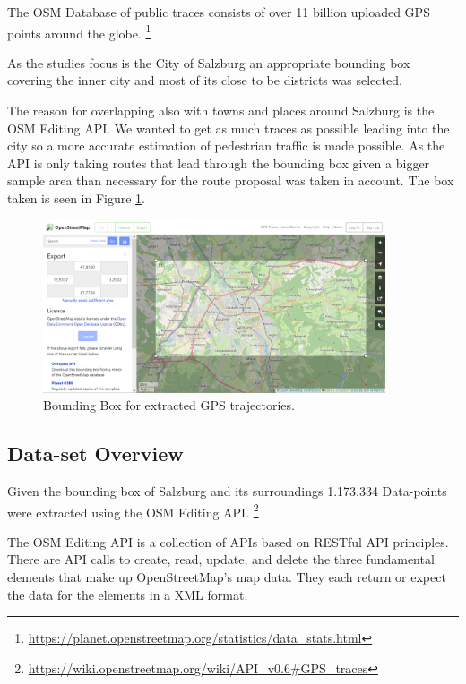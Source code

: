 The OSM Database of public traces consists of over 11 billion uploaded GPS points around the globe. \footnote{\url{https://planet.openstreetmap.org/statistics/data_stats.html}}

As the studies focus is the City of Salzburg an appropriate bounding box covering the inner city and most of its close to be districts was selected. 

The reason for overlapping also with towns and places around Salzburg is the OSM Editing API. We wanted to get as much traces as possible leading into the city so a more accurate estimation of pedestrian traffic is made possible. As the API is only taking routes that lead through the bounding box given a bigger sample area than necessary for the route proposal was taken in account. The box taken is seen in Figure \ref{figure:BoundingBox}.

\begin{figure}[t]
 	\centering
 	\includegraphics[width=0.9\textwidth]{images/BoundingBoxOSM.png}
 	\caption{
 		Bounding Box for extracted GPS trajectories.
 	}
 	\label{figure:BoundingBox}
\end{figure}

\subsection{Data-set Overview}

Given the bounding box of Salzburg and its surroundings 1.173.334 Data-points were extracted using the OSM Editing API. \footnote{\url{https://wiki.openstreetmap.org/wiki/API_v0.6#GPS_traces}}

The OSM Editing API is a collection of APIs based on RESTful API principles. There are API calls to create, read, update, and delete the three fundamental elements that make up OpenStreetMap's map data. They each return or expect the data for the elements in a XML format.
\autocite[]{wiki:xxx}

